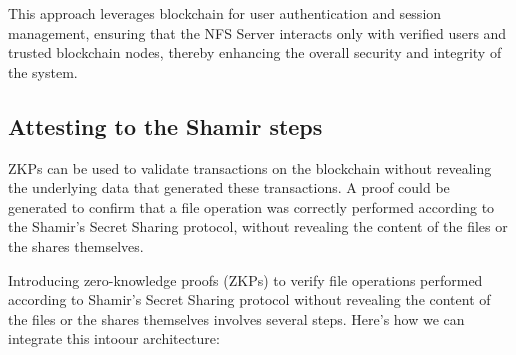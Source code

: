 \documentclass{tufte-handout}
\begin{document}
This approach leverages blockchain for user authentication and session management, ensuring that the NFS Server interacts only with verified users and trusted
blockchain nodes, thereby enhancing the overall security and integrity of the system.

\subsection{Attesting to the Shamir steps}\label{sec:headings}
ZKPs can be used to validate transactions on the blockchain without revealing the underlying data that generated these transactions. A proof could be generated to
confirm that a file operation was correctly performed according to the Shamir's Secret Sharing protocol, without revealing the content of the files or the shares themselves.

Introducing zero-knowledge proofs (ZKPs) to verify file operations performed according to Shamir's Secret Sharing protocol without revealing the content of the files or the
shares themselves involves several steps. Here's how we can integrate this intoour architecture:
\end{document}
